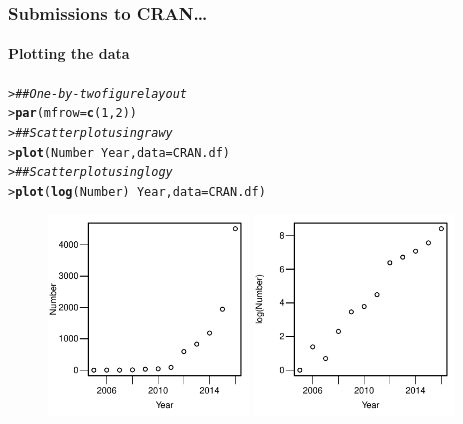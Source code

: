 \documentclass{beamer}\usepackage[]{graphicx}\usepackage[]{xcolor}
\makeatletter
\newcommand{\hlnum}[1]{\textcolor[rgb]{0.686,0.059,0.569}{#1}}%
\newcommand{\hlcom}[1]{\textcolor[rgb]{0.678,0.584,0.686}{\textit{#1}}}%
\newcommand{\hlopt}[1]{\textcolor[rgb]{0,0,0}{#1}}%
\newcommand{\hlstd}[1]{\textcolor[rgb]{0.345,0.345,0.345}{#1}}%
\newcommand{\hlkwc}[1]{\textcolor[rgb]{0.333,0.667,0.333}{#1}}%
\newcommand{\hlkwd}[1]{\textcolor[rgb]{0.737,0.353,0.396}{\textbf{#1}}}%
\newenvironment{kframe}{%
 \def\at@end@of@kframe{}%
 \ifinner\ifhmode%
  \def\at@end@of@kframe{\end{minipage}}%
  \begin{minipage}{\columnwidth}%
 \fi\fi%
 \def\FrameCommand##1{\hskip\@totalleftmargin \hskip-\fboxsep
 \colorbox{shadecolor}{##1}\hskip-\fboxsep
     \hskip-\linewidth \hskip-\@totalleftmargin \hskip\columnwidth}%
 \MakeFramed {\advance\hsize-\width
   \@totalleftmargin\z@ \linewidth\hsize
   \@setminipage}}%
 {\par\unskip\endMakeFramed%
 \at@end@of@kframe}
\newenvironment{knitrout}{}{} %
\makeatother
\begin{document}
\begin{frame}[fragile]
\frametitle{Submissions to CRAN\ldots}
\framesubtitle{Plotting the data}

\begin{knitrout}\scriptsize
{}\color{fgcolor}\begin{kframe}
\begin{alltt}
\hlstd{> }\hlcom{## One-by-two figure layout}
\hlstd{> }\hlkwd{par}\hlstd{(}\hlkwc{mfrow}\hlstd{=}\hlkwd{c}\hlstd{(}\hlnum{1}\hlstd{,}\hlnum{2}\hlstd{))}
\hlstd{> }\hlcom{## Scatter plot using raw y}
\hlstd{> }\hlkwd{plot}\hlstd{(Number} \hlopt{~} \hlstd{Year,} \hlkwc{data} \hlstd{= CRAN.df)}
\hlstd{> }\hlcom{## Scatter plot using log y}
\hlstd{> }\hlkwd{plot}\hlstd{(}\hlkwd{log}\hlstd{(Number)} \hlopt{~} \hlstd{Year,} \hlkwc{data} \hlstd{= CRAN.df)}
\end{alltt}
\end{kframe}
\end{knitrout}



\begin{figure}
   \includegraphics[width=0.475\textwidth]{figure/RC-H13-003A}
   \hfill
   \includegraphics[width=0.475\textwidth]{figure/RC-H13-003B}
\end{figure}

\end{frame}
\end{document}
